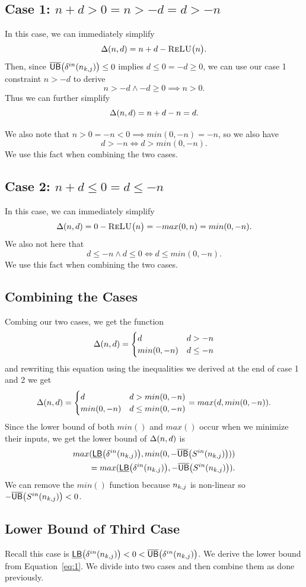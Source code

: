 \subsection*{Case 1: $ n + d > 0 = n > -d = d > -n $}
In this case, we can immediately simplify
\[
	\Delta(n,d) = n + d - \textsc{ReLU}\big(n\big).
\]
Then, since $ \overline{\mathsf{UB}}\big(\delta^{in}(n_{k,j})\big) \leq 0 $ implies $ d \leq 0 = -d \geq 0 $,
we can use our case 1 constraint $ n > -d $ to derive
\[
	n > -d \wedge -d \geq 0 \implies n > 0.
\]
Thus we can further simplify
\[
	\Delta(n,d) = n + d - n = d.
\]

We also note that $ n > 0 = -n < 0 \implies min(0, -n) = -n $, so we also have
\[
	d > -n \iff d > min(0, -n).
\]
We use this fact when combining the two cases.

\subsection*{Case 2: $ n + d \leq 0 = d \leq -n $}
In this case, we can immediately simplify
\[
	\Delta(n,d) = 0 - \textsc{ReLU}\big(n\big) = -max(0, n) = min(0, -n).
\]
We also not here that
\[
	d \leq -n \wedge d \leq 0 \iff d \leq min(0, -n).
\]
We use this fact when combining the two cases.

\subsection*{Combining the Cases}
Combing our two cases, we get the function
\[
	\Delta(n,d) = \begin{cases}
	d & d > -n\\
	min(0, -n) & d \leq -n
	\end{cases}
\]
and rewriting this equation using the inequalities we derived at the end of case 1 and 2
we get
\[
\Delta(n,d) = \begin{cases}
d & d > min(0, -n)\\
min(0, -n) & d \leq min(0, -n)
\end{cases} = max(d, min(0, -n)).
\]
Since the lower bound of both $ min() $ and $ max() $ occur when we minimize their inputs, we get the lower bound of $ \Delta(n,d) $ is
\begin{align*}
max(\underline{\mathsf{LB}}\big(\delta^{in}(n_{k,j})\big), min(0, -\overline{\mathsf{UB}}\big(S^{in}(n_{k,j})\big)))\\
= max(\underline{\mathsf{LB}}\big(\delta^{in}(n_{k,j})\big), -\overline{\mathsf{UB}}\big(S^{in}(n_{k,j})\big)).
\end{align*}
We can remove the $ min() $ function because $ n_{k,j} $ is non-linear so $ -\overline{\mathsf{UB}}\big(S^{in}(n_{k,j})\big) < 0 $.

\subsection{Lower Bound of Third Case}
Recall this case is $ \underline{\mathsf{LB}}\big(\delta^{in}(n_{k,j})\big) < 0 < \overline{\mathsf{UB}}\big(\delta^{in}(n_{k,j})\big) $. We derive the lower bound from Equation~\ref{eq:1}. We divide into two cases and then combine them as done previously.

